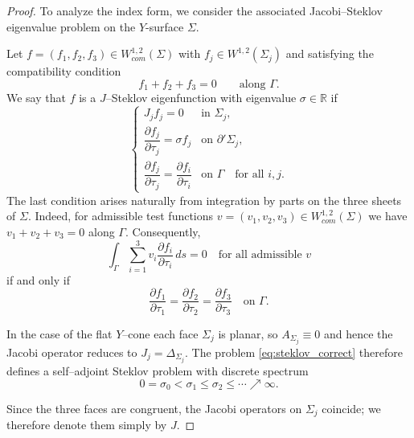 \documentclass[11pt]{amsart}
\numberwithin{equation}{section}
\theoremstyle{theorem}
\theoremstyle{definition}
\numberwithin{equation}{section}
\begin{document}
\begin{proof}
To analyze the index form, we consider the associated Jacobi--Steklov
eigenvalue problem on the $Y$-surface $\Sigma$.

Let $f=(f_1,f_2,f_3)\in W^{1,2}_{com}(\Sigma)$ with
$f_j\in W^{1,2}(\Sigma_j)$ and satisfying the compatibility condition
\[
f_1+f_2+f_3=0 \qquad \text{along }\Gamma .
\]
We say that $f$ is a $J$--Steklov eigenfunction with eigenvalue
$\sigma\in\mathbb{R}$ if
\begin{equation}\label{eq:steklov_correct}
\begin{cases}
J_j f_j =0 & \text{in } \Sigma_j, \\[4pt]
\dfrac{\partial f_j}{\partial \tau_j}=\sigma f_j
& \text{on } \partial'\Sigma_j , \\[8pt]
\dfrac{\partial f_j}{\partial \tau_j}
=
\dfrac{\partial f_i}{\partial \tau_i}
& \text{on } \Gamma \quad \text{for all } i, j.
\end{cases}
\end{equation}
The last condition arises naturally from integration by parts on the
three sheets of $\Sigma$. Indeed, for admissible test functions
$v=(v_1,v_2,v_3)\in W^{1,2}_{com}(\Sigma)$ we have
$v_1+v_2+v_3=0$ along $\Gamma$. Consequently,
\[
\int_{\Gamma}\sum_{i=1}^3 v_i
\frac{\partial f_i}{\partial \tau_i}\,ds=0
\quad\text{for all admissible } v
\]
if and only if
\[
\frac{\partial f_1}{\partial \tau_1}
=
\frac{\partial f_2}{\partial \tau_2}
=
\frac{\partial f_3}{\partial \tau_3}
\quad \text{on }\Gamma .
\]

In the case of the flat $Y$--cone each face $\Sigma_j$ is planar,
so $A_{\Sigma_j}\equiv0$ and hence the Jacobi operator reduces to
$J_j=\Delta_{\Sigma_j}$. The problem \eqref{eq:steklov_correct}
therefore defines a self--adjoint Steklov problem with discrete
spectrum
\[
0=\sigma_0<\sigma_1\le\sigma_2\le\cdots\nearrow\infty .
\]

Since the three faces are congruent, the Jacobi operators on
$\Sigma_j$ coincide; we therefore denote them simply by $J$.
\medskip


\end{proof}
\end{document}
